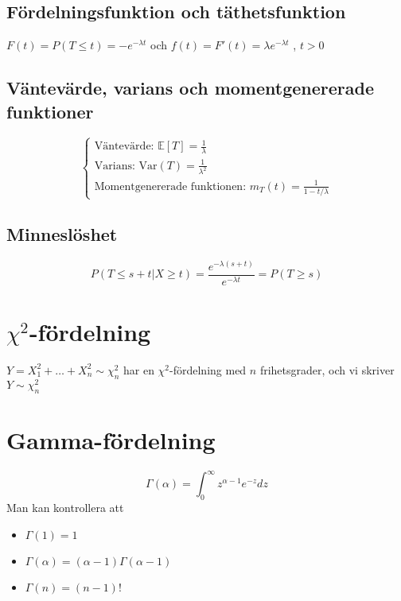 \subsection{Fördelningsfunktion och täthetsfunktion}
$F(t)=P(T\leq t)=-e^{-\lambda t}$ och $f(t)=F'(t)=\lambda e^{-\lambda t}$ , $t>0$
\subsection{Väntevärde, varians och momentgenererade funktioner}
$$
	\begin{cases}
		\text{Väntevärde: }\mathbb{E}[T]=\frac{1}{\lambda} \\
		\text{Varians: }\text{Var}(T)=\frac{1}{\lambda^2}  \\
		\text{Momentgenererade funktionen: } m_T(t)=\frac{1}{1-t/\lambda}
	\end{cases}
$$
\subsection{Minneslöshet}
$$
	P(T\leq s+t | X\geq t)=\frac{e^{-\lambda(s+t)}}{e^{-\lambda t}}=P(T\geq s)
$$

\section{$\chi^2$-fördelning}
$Y=X^2_1+\ldots+X^2_n\sim\chi^2_n$ har en $\chi^2$-fördelning med $n$ frihetsgrader, och vi skriver $Y\sim\chi^2_n$
\section{Gamma-fördelning}
$$\Gamma(\alpha)=\int_0^\infty z^{\alpha-1}e^{-z}dz$$
Man kan kontrollera att \begin{itemize}
	\item $\Gamma(1)=1$
	\item $\Gamma(\alpha)=(\alpha-1)\Gamma(\alpha-1)$
	\item $\Gamma(n)=(n-1)!$
\end{itemize}